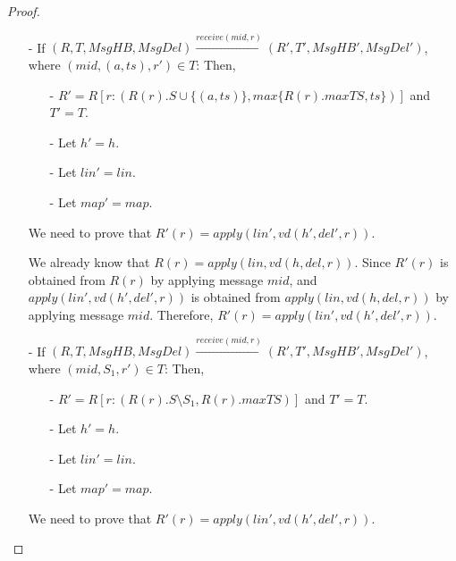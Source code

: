 {\begin {proof}
\begin{itemize}
\item[-] If $(R,T,\mathit{MsgHB},\mathit{MsgDel}) {\xrightarrow{\mathit{receive}(\mathit{mid},r)}} (R',T',\mathit{MsgHB}',\mathit{MsgDel}')$, where $(\mathit{mid},(a,\mathit{ts}),r') \in T$: Then,

    \begin{itemize}
    \setlength{\itemsep}{0.5pt}
    \item[-] $R' = R[ r: (R(r).S \cup \{ (a,\mathit{ts}) \},\mathit{max} \{ R(r).\mathit{maxTS},\mathit{ts} \} ) ]$ and $T' = T$.

    \item[-] Let $h' = h$.

    \item[-] Let $\mathit{lin}' = \mathit{lin}$.

    \item[-] Let $\mathit{map}' = \mathit{map}$.
    \end{itemize}

    We need to prove that $R'(r) = \mathit{apply}(\mathit{lin}',\mathit{vd}(h',\mathit{del}',r))$.

    We already know that $R(r) = \mathit{apply}(\mathit{lin},\mathit{vd}(h,\mathit{del},r))$. Since $R'(r)$ is obtained from $R(r)$ by applying message $\mathit{mid}$, and $\mathit{apply}(\mathit{lin}',\mathit{vd}(h',\mathit{del}',r))$ is obtained from $\mathit{apply}(\mathit{lin},\mathit{vd}(h,\mathit{del},r))$ by applying message $\mathit{mid}$. Therefore, $R'(r) = \mathit{apply}(\mathit{lin}',\mathit{vd}(h',\mathit{del}',r))$.

\item[-] If $(R,T,\mathit{MsgHB},\mathit{MsgDel}) {\xrightarrow{\mathit{receive}(\mathit{mid},r)}} (R',T',\mathit{MsgHB}',\mathit{MsgDel}')$, where $(\mathit{mid},S_1,r') \in T$: Then,

    \begin{itemize}
    \setlength{\itemsep}{0.5pt}
    \item[-] $R' = R[ r: (R(r).S \setminus S_1, R(r).\mathit{maxTS}) ]$ and $T' = T$.

    \item[-] Let $h' = h$.

    \item[-] Let $\mathit{lin}' = \mathit{lin}$.

    \item[-] Let $\mathit{map}' = \mathit{map}$.
    \end{itemize}

    We need to prove that $R'(r) = \mathit{apply}(\mathit{lin}',\mathit{vd}(h',\mathit{del}',r))$.


\end{itemize}
\end{proof}}
